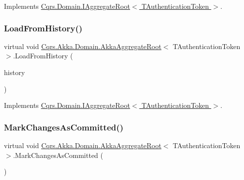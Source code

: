 Implements \hyperlink{interfaceCqrs_1_1Domain_1_1IAggregateRoot_a22fda414613f5ac0d4371554d7d6473b}{Cqrs.\+Domain.\+I\+Aggregate\+Root$<$ T\+Authentication\+Token $>$}.

\mbox{\label{classCqrs_1_1Akka_1_1Domain_1_1AkkaAggregateRoot_af6d84b07d4e9475bb88e769ac9081830}} 
\subsubsection{\texorpdfstring{Load\+From\+History()}{LoadFromHistory()}}
{\footnotesize\ttfamily virtual void \hyperlink{classCqrs_1_1Akka_1_1Domain_1_1AkkaAggregateRoot}{Cqrs.\+Akka.\+Domain.\+Akka\+Aggregate\+Root}$<$ T\+Authentication\+Token $>$.Load\+From\+History (\begin{DoxyParamCaption}\item[{I\+Enumerable$<$ \hyperlink{interfaceCqrs_1_1Events_1_1IEvent}{I\+Event}$<$ T\+Authentication\+Token $>$$>$}]{history }\end{DoxyParamCaption})\hspace{0.3cm}{\ttfamily [virtual]}}



Implements \hyperlink{interfaceCqrs_1_1Domain_1_1IAggregateRoot_afe9329ee26ae68613059189ca64dfe60}{Cqrs.\+Domain.\+I\+Aggregate\+Root$<$ T\+Authentication\+Token $>$}.

\mbox{\label{classCqrs_1_1Akka_1_1Domain_1_1AkkaAggregateRoot_a0d2615067175e5f8249bb2dc3d17ee0b}} 
\subsubsection{\texorpdfstring{Mark\+Changes\+As\+Committed()}{MarkChangesAsCommitted()}}
{\footnotesize\ttfamily virtual void \hyperlink{classCqrs_1_1Akka_1_1Domain_1_1AkkaAggregateRoot}{Cqrs.\+Akka.\+Domain.\+Akka\+Aggregate\+Root}$<$ T\+Authentication\+Token $>$.Mark\+Changes\+As\+Committed (\begin{DoxyParamCaption}{ }\end{DoxyParamCaption})\hspace{0.3cm}{\ttfamily [virtual]}}



